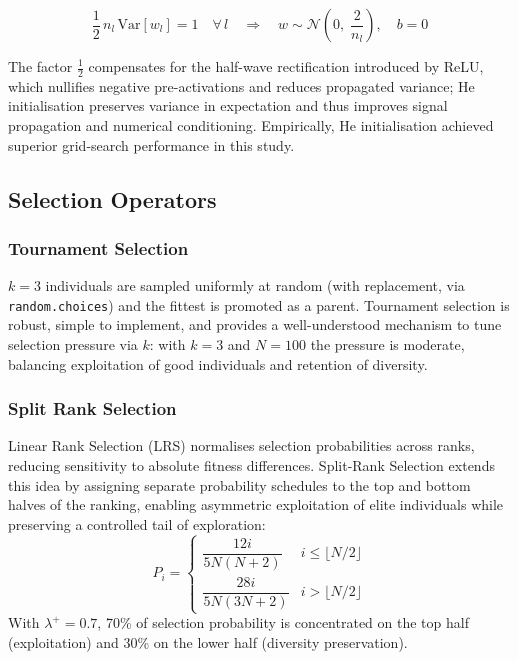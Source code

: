 \documentclass[12pt, a4paper]{article}
\begin{document}
\begin{infobox}[title=He Initialisation Condition \cite{he2015}]
\[
\frac{1}{2}\,n_l\,\mathrm{Var}[w_l] = 1 \quad \forall\,l
\quad \Longrightarrow \quad
w \sim \mathcal{N}\!\left(0,\;\frac{2}{n_l}\right), \quad b = 0
\]
\end{infobox}

The factor $\tfrac{1}{2}$ compensates for the half-wave rectification introduced by ReLU, which nullifies negative pre-activations and reduces propagated variance; He initialisation preserves variance in expectation and thus improves signal propagation and numerical conditioning. Empirically, He initialisation achieved superior grid-search performance in this study.

\subsection{Selection Operators}

\subsubsection{Tournament Selection}
$k=3$ individuals are sampled uniformly at random (with replacement, via \texttt{random.choices}) and the fittest is promoted as a parent. Tournament selection is robust, simple to implement, and provides a well-understood mechanism to tune selection pressure via $k$: with $k=3$ and $N=100$ the pressure is moderate, balancing exploitation of good individuals and retention of diversity.

\subsubsection{Split Rank Selection}
Linear Rank Selection (LRS) normalises selection probabilities across ranks, reducing sensitivity to absolute fitness differences. Split-Rank Selection \cite{splitrank} extends this idea by assigning separate probability schedules to the top and bottom halves of the ranking, enabling asymmetric exploitation of elite individuals while preserving a controlled tail of exploration:
\[
P_i = \begin{cases} \dfrac{12i}{5N(N+2)} & i \leq \lfloor N/2 \rfloor \\[8pt] \dfrac{28i}{5N(3N+2)} & i > \lfloor N/2 \rfloor \end{cases}
\]
With $\lambda^+=0.7$, 70\% of selection probability is concentrated on the top half (exploitation) and 30\% on the lower half (diversity preservation).
\end{document}

